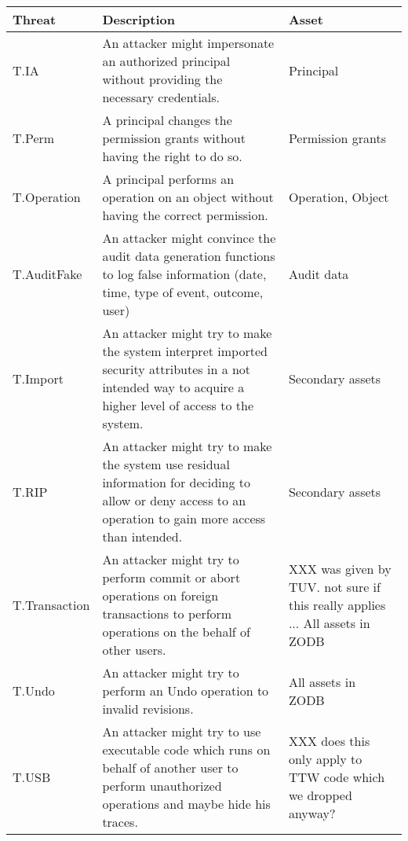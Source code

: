 \documentclass[12pt,english]{scrbook}
\begin{document}
\begin{longtable}[c]{lp{6cm}p{4cm}}
  \toprule
  Threat & Description & Asset\\
  \midrule\endhead

  T.IA
   & 
  An attacker might impersonate an authorized
  principal without providing the necessary
  credentials.
   & 
  Principal
   \\
  

  T.Perm
   & 
  A principal changes the permission grants
  without having the right to do so.
   & 
  Permission grants
   \\
  

  T.Operation
   & 
  A principal performs an operation on an object
  without having the correct permission.
   & 
  Operation, Object
   \\
  

  T.AuditFake
   & 
  An attacker might convince the audit data
  generation functions to log false information
  (date, time, type of event, outcome, user)
   & 
  Audit data
   \\
  

  T.Import
   & 
  An attacker might try to make the system
  interpret imported security attributes in a
  not intended way to acquire a higher level of
  access to the system.
   & 
  Secondary assets
   \\
  

  T.RIP
   & 
  An attacker might try to make the system use
  residual information for deciding to allow
  or deny access to an operation to gain more
  access than intended.
   & 
  Secondary assets
   \\
  

  T.Transaction
   & 
  An attacker might try to perform commit or
  abort operations on foreign transactions to
  perform operations on the behalf of other
  users.
   & 
  XXX was given by TUV. not sure if this really applies ...
  All assets in ZODB
   \\
  

  T.Undo
   & 
  An attacker might try to perform an Undo
  operation to invalid revisions.
   & 
  All assets in ZODB
   \\
  

  T.USB
   & 
  An attacker might try to use executable code
  which runs on behalf of another user to perform
  unauthorized operations and maybe hide his
  traces.
   & 
  XXX does this only apply to TTW code which we dropped anyway?
   \\
  


\end{longtable}
\end{document}
